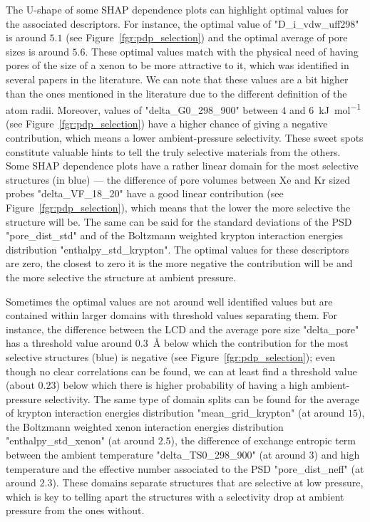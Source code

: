 \documentclass[main]{subfiles}
\begin{document}
The U-shape of some SHAP dependence plots can highlight optimal values for the associated descriptors. For instance, the optimal value of "D\_i\_vdw\_uff298" is around $5.1$ (see Figure~\ref{fgr:pdp_selection}) and the optimal average of pore sizes is around $5.6$. These optimal values match with the physical need of having pores of the size of a xenon to be more attractive to it, which was identified in several papers in the literature. We can note that these values are a bit higher than the ones mentioned in the literature due to the different definition of the atom radii.\cite{Hung_2021} Moreover, values of "delta\_G0\_298\_900" between $4$ and \SI{6}{\kilo\joule\per\mole} (see Figure~\ref{fgr:pdp_selection}) have a higher chance of giving a negative contribution, which means a lower ambient-pressure selectivity. These sweet spots constitute valuable hints to tell the truly selective materials from the others. Some SHAP dependence plots have a rather linear domain for the most selective structures (in blue) --- the difference of pore volumes between Xe and Kr sized probes "delta\_VF\_18\_20" have a good linear contribution (see Figure~\ref{fgr:pdp_selection}), which means that the lower the more selective the structure will be. The same can be said for the standard deviations of the PSD "pore\_dist\_std" and of the Boltzmann weighted krypton interaction energies distribution "enthalpy\_std\_krypton". The optimal values for these descriptors are zero, the closest to zero it is the more negative the contribution will be and the more selective the structure at ambient pressure.

Sometimes the optimal values are not around well identified values but are contained within larger domains with threshold values separating them. For instance, the difference between the LCD and the average pore size "delta\_pore" has a threshold value around \SI{0.3}{\angstrom} below which the contribution for the most selective structures (blue) is negative (see Figure~\ref{fgr:pdp_selection}); even though no clear correlations can be found, we can at least find a threshold value (about $0.23$) below which there is higher probability of having a high ambient-pressure selectivity. The same type of domain splits can be found for the average of krypton interaction energies distribution "mean\_grid\_krypton" (at around $15$), the Boltzmann weighted xenon interaction energies distribution "enthalpy\_std\_xenon" (at around $2.5$), the difference of exchange entropic term between the ambient temperature "delta\_TS0\_298\_900" (at around $3$) and high temperature and the effective number associated to the PSD "pore\_dist\_neff" (at around $2.3$). These domains separate structures that are selective at low pressure, which is key to telling apart the structures with a selectivity drop at ambient pressure from the ones without.
\end{document}
